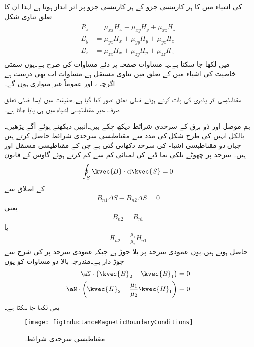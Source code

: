  کی اشیاء میں  کا ہر کارتیسی جزو  کے ہر کارتیسی جزو پر اثر انداز ہوتا ہے لہٰذا ان کا تعلق تناوی شکل
\begin{gather}
\begin{aligned}\label{مساوت_امالہ_تناوی-مساوات}
B_x&=\mu_{xx} H_x +\mu_{xy} H_y+\mu_{xz} H_z\\
B_y&=\mu_{yx} H_x +\mu_{yy} H_y+\mu_{yz} H_z\\
B_z&=\mu_{zx} H_x +\mu_{zy} H_y+\mu_{zz} H_z
\end{aligned}
\end{gather}
میں لکھا جا سکتا ہے۔یہ مساوات صفحہ  پر دئے مساوات  کی طرح ہے۔یوں سمتی خاصیت کی اشیاء میں  کے تعلق میں  تناوی مستقل ہے۔مساوات  اب بھی درست ہے اگرچہ ،  اور  عموماً غیر متوازی ہوں گے۔

مقناطیسی اثر پذیری کی بات کرتے ہوئے خطی تعلق تصور کیا گیا ہے۔حقیقت میں ایسا خطی تعلق صرف غیر مقناطیسی اشیاء میں ہی پایا جاتا ہے۔


ہم موصل اور ذو برق کے سرحدی شرائط دیکھ چکے ہیں۔انہیں دیکھتے ہوئے آگے پڑھیں۔بالکل انہیں کی طرح شکل  کی مدد سے مقناطیسی سرحدی شرائط حاصل کرتے ہیں جہاں دو مقناطیسی اشیاء کی سرحد دکھائی گئی ہے جن کے مقناطیسی مستقل  اور  ہیں۔ سرحد پر چھوٹے نلکی نما ڈبے کی لمبائی کم سے کم کرتے ہوئے گاوس کے قانون
\begin{align*}
\oint_S \kvec{B} \cdot \dif \kvec{S}=0
\end{align*}
کے اطلاق سے
\begin{align*}
B_{n1}\Delta S-B_{n2} \Delta S=0
\end{align*}
یعنی
\begin{align}\label{مساوات_امالہ_عمودی_مقناطیسی_میدان_بے_جوڑ_ہے}
B_{n2}=B_{n1}
\end{align}
یا
\begin{align}
H_{n2}=\frac{\mu_1}{\mu_2} H_{n1}
\end{align}
حاصل ہوتے ہیں۔یوں عمودی  سرحد پر بلا جوڑ ہے جبکہ عمودی  سرحد پر  کی شرح سے جوڑ دار ہے۔مندرجہ بالا دو مساوات کو یوں
\begin{align}
\aN  \cdot \left(\kvec{B}_2-\kvec{B}_1 \right)&=0\\
\aN \cdot \left(\kvec{H}_2-\frac{\mu_1}{\mu_2} \kvec{H}_1 \right)&=0
\end{align}
بھی لکھا جا سکتا ہے۔
 \begin{figure}
\centering
\texttt{[image: figInductanceMagneticBoundaryConditions]}
\caption{مقناطیسی سرحدی شرائط۔}
\label{شکل_امالہ_مقناطیسی_سرحدی_شرائط}
\end{figure}

